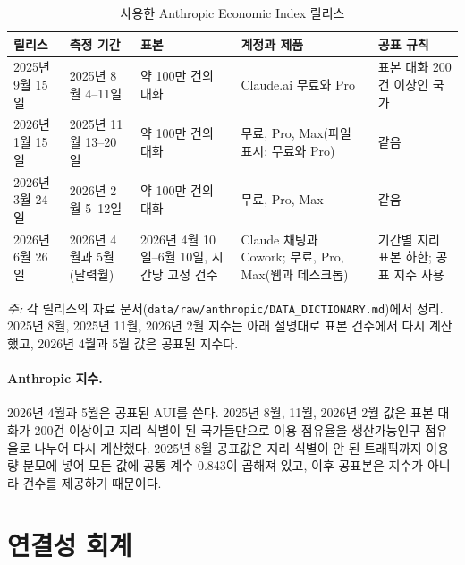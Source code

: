 \documentclass[11pt]{article}
\theoremstyle{definition}
\theoremstyle{remark}
\begin{document}
\begin{table}[ht]\centering\begin{threeparttable}
\caption{사용한 Anthropic Economic Index 릴리스}\label{tab:aei_releases}
\scriptsize\begin{tabular}{@{}>{\raggedright\arraybackslash}p{1.8cm}>{\raggedright\arraybackslash}p{2.6cm}>{\raggedright\arraybackslash}p{3.0cm}>{\raggedright\arraybackslash}p{3.3cm}>{\raggedright\arraybackslash}p{3.3cm}@{}}\toprule
릴리스 & 측정 기간 & 표본 & 계정과 제품 & 공표 규칙 \\\midrule
2025년 9월 15일 & 2025년 8월 4--11일 & 약 100만 건의 대화 & Claude.ai 무료와 Pro & 표본 대화 200건 이상인 국가 \\
2026년 1월 15일 & 2025년 11월 13--20일 & 약 100만 건의 대화 & 무료, Pro, Max(파일 표시: 무료와 Pro) & 같음 \\
2026년 3월 24일 & 2026년 2월 5--12일 & 약 100만 건의 대화 & 무료, Pro, Max & 같음 \\
2026년 6월 26일 & 2026년 4월과 5월(달력월) & 2026년 4월 10일--6월 10일, 시간당 고정 건수 & Claude 채팅과 Cowork; 무료, Pro, Max(웹과 데스크톱) & 기간별 지리 표본 하한; 공표 지수 사용 \\
\bottomrule\end{tabular}
\begin{tablenotes}[flushleft]\footnotesize\item \emph{주:} 각 릴리스의 자료 문서(\nolinkurl{data/raw/anthropic/DATA_DICTIONARY.md})에서 정리. 2025년 8월, 2025년 11월, 2026년 2월 지수는 아래 설명대로 표본 건수에서 다시 계산했고, 2026년 4월과 5월 값은 공표된 지수다.\end{tablenotes}
\end{threeparttable}\end{table}

\paragraph{Anthropic 지수.} 2026년 4월과 5월은 공표된 AUI를 쓴다. 2025년 8월, 11월, 2026년 2월 값은 표본 대화가 200건 이상이고 지리 식별이 된 국가들만으로 이용 점유율을 생산가능인구 점유율로 나누어 다시 계산했다. 2025년 8월 공표값은 지리 식별이 안 된 트래픽까지 이용량 분모에 넣어 모든 값에 공통 계수 0.843이 곱해져 있고, 이후 공표본은 지수가 아니라 건수를 제공하기 때문이다.

\section{연결성 회계}\label{app:connectivity}
\end{document}
